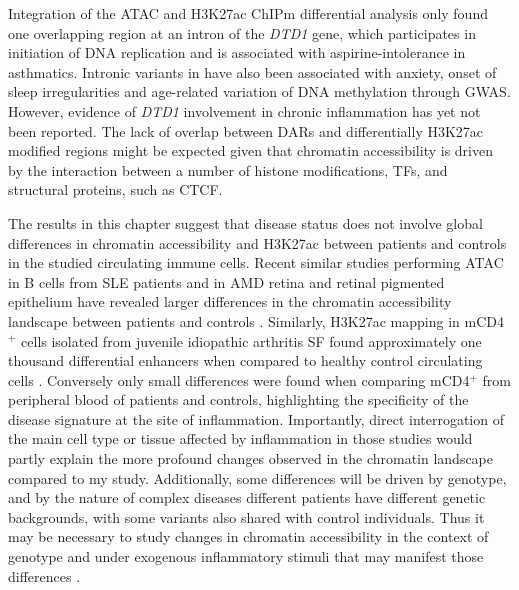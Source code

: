 Integration of the ATAC and H3K27ac ChIPm differential analysis only found one overlapping region at an intron of the \textit{DTD1} gene, which participates in initiation of DNA replication and is associated with aspirine-intolerance in asthmatics\parencite{Pasaje2011}. Intronic variants in  have also been associated with anxiety, onset of sleep irregularities and age-related variation of DNA methylation through GWAS. However, evidence of \textit{DTD1} involvement in chronic inflammation has yet not been reported. The lack of overlap between DARs and differentially H3K27ac modified regions might be expected given that chromatin accessibility is driven by the interaction between a number of histone modifications, TFs, and structural proteins, such as CTCF. 

The results in this chapter suggest that disease status does not involve global differences in chromatin accessibility and H3K27ac between patients and controls in the studied circulating immune cells. Recent similar studies performing ATAC in B cells from SLE patients and in AMD retina and retinal pigmented epithelium have revealed larger differences in the chromatin accessibility landscape between patients and controls \parencite{Scharer2016,Wang2018}. Similarly, H3K27ac mapping in mCD4$^+$ cells isolated from juvenile idiopathic arthritis SF found approximately one thousand differential enhancers when compared to healthy control circulating cells \parencite{Peeters2015}. Conversely only small differences were found when comparing mCD4$^+$ from peripheral blood of patients and controls, highlighting the specificity of the disease signature at the site of inflammation. Importantly, direct interrogation of the main cell type or tissue affected by inflammation in those studies would partly explain the more profound changes observed in the chromatin landscape compared to my study. Additionally, some differences will be driven by genotype, and by the nature of complex diseases different patients have different genetic backgrounds, with some variants also shared with control individuals. Thus it may be necessary to study changes in chromatin accessibility in the context of genotype and under exogenous inflammatory stimuli that may manifest those differences \parencite{Alasoo2018,Calderon2018}.

